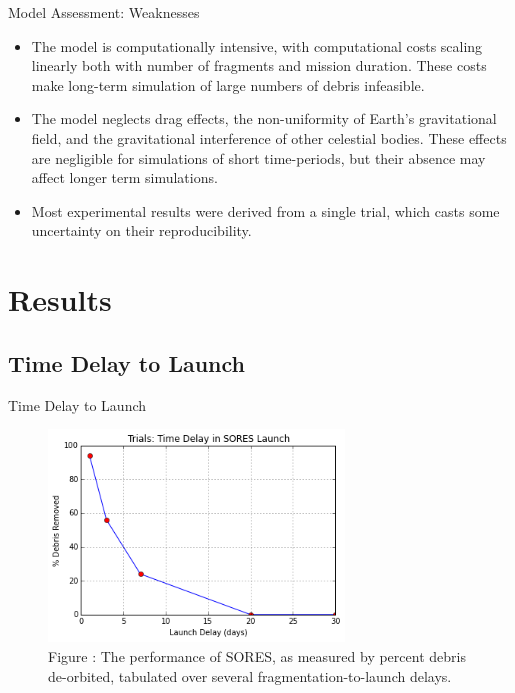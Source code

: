 \documentclass{beamer}
\begin{document}
\begin{frame}{Model Assessment: Weaknesses}
 \begin{itemize}
        \item The model is computationally intensive, with computational costs scaling linearly both with number of fragments and mission duration. These costs make long-term simulation of large numbers of debris infeasible.
        \item The model neglects drag effects, the non-uniformity of Earth's gravitational field, and the gravitational interference of other celestial bodies. These effects are negligible for simulations of short time-periods, but their absence may affect longer term simulations.
        \item Most experimental results were derived from a single trial, which casts some uncertainty on their reproducibility.
    \end{itemize}
\end{frame}



\section{Results}

\subsection{Time Delay to Launch}

\begin{frame}{Time Delay to Launch}
\begin{figure}
\begin{center}
\label{fig:resultsvslaunchdelay}
\includegraphics[width=0.7\textwidth]{delay.png}\\
Figure : The performance of SORES, as measured by percent debris de-orbited, tabulated over several fragmentation-to-launch delays.
\end{center}
\end{figure}
\end{frame}
\end{document}
